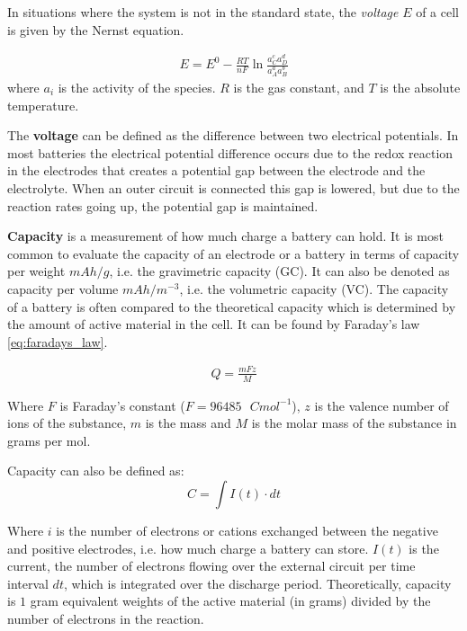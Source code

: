 	In situations where the system is not in the standard state, the \textit{voltage} $E$ of a cell is given by the Nernst equation.
	
	\begin{align}
	E = E^0 -\frac{RT}{nF} \ln{\frac{a^c_C a^d_D} {a^a_A a^b_B} }
	\end{align} 	
	where $a_i$ is the activity of the species. $R$ is the gas constant, and $T$ is the absolute temperature.
	
	The \textbf{voltage} can be defined as the difference between two electrical potentials. In most batteries the electrical potential difference occurs due to the redox reaction in the electrodes that creates a potential gap between the electrode and the electrolyte. When an outer circuit is connected this gap is lowered, but due to the reaction rates going up, the potential gap is maintained.
	
	
	\textbf{Capacity} is a measurement of how much charge a battery can hold. It is most common to evaluate the capacity of an electrode or a battery in terms of capacity per weight $\si{mAh/g}$, i.e. the gravimetric capacity (\ac{GC}). It can also be denoted as capacity per volume $\si{mAh/m^{-3}}$, i.e. the volumetric capacity (\ac{VC}). The capacity of a battery is often compared to the theoretical capacity which is determined by the amount of active material in the cell. It can be found by Faraday's law \ref{eq:faradays_law}.
	
	\begin{align}\label{eq:faradays_law}
	Q=\frac{mFz}{M}
	\end{align}
	
	Where $F$ is Faraday's constant ($F = 96485\text{ }\si{C mol^{-1}}$), $z$ is the valence number of ions of the substance, $m$ is the mass and $M$ is the molar mass of the substance in grams per mol.
	
	Capacity can also be defined as:
	\begin{equation}
	C = \int I(t)\cdot dt
	\end{equation}
	
	Where $i$ is the number of electrons or cations exchanged between the negative and positive electrodes, i.e. how much charge a battery can store. $I(t)$ is the current, the number of electrons flowing over the external circuit per time interval $dt$, which is integrated over the discharge period. Theoretically, capacity is $1$ gram equivalent weights of the active material (in grams) divided by the number of electrons in the reaction.	


